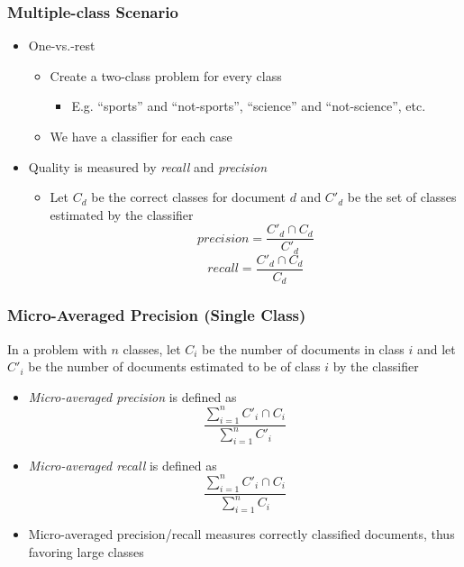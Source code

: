 \documentclass{beamer}
\begin{document}

\begin{frame} \frametitle{Multiple-class Scenario }
  
  \begin{itemize}
  \item One-vs.-rest
    \begin{itemize}
    \item Create a two-class problem for every class
      \begin{itemize}
      \item E.g. ``sports'' and ``not-sports'', ``science'' and
        ``not-science'', etc.
      \end{itemize}
    \item We have a classifier for each case
    \end{itemize}
  \item Quality is measured by \emph{recall} and \emph{precision}
    \begin{itemize}
    \item Let $C_d$ be the correct classes for document $d$ and $C'_d$ be the
      set of classes estimated by the classifier
      \begin{displaymath}
        precision = \frac{C'_d \cap C_d}{C'_d}
      \end{displaymath}
      \begin{displaymath}
        recall = \frac{C'_d \cap C_d}{C_d}
      \end{displaymath}
    \end{itemize}
  \end{itemize}
\end{frame}


\begin{frame} \frametitle{Micro-Averaged Precision (Single Class)}
  
  In a problem with $n$ classes, let $C_i$ be the number of documents in class
  $i$ and let $C'_i$ be the number of documents estimated to be of class $i$ by
  the classifier
  \begin{itemize}
  \item \emph{Micro-averaged precision} is defined as
    \begin{displaymath}
      \frac{\sum_{i=1}^n C'_i \cap C_i}{\sum_{i=1}^n C'_i}
    \end{displaymath}
  \item \emph{Micro-averaged recall} is defined as
    \begin{displaymath}
      \frac{\sum_{i=1}^n C'_i \cap C_i}{\sum_{i=1}^n C_i}
    \end{displaymath}
  \end{itemize}
  \begin{itemize}
  \item Micro-averaged precision/recall measures correctly classified
    documents, thus favoring large classes
  \end{itemize}
\end{frame}
\end{document}

